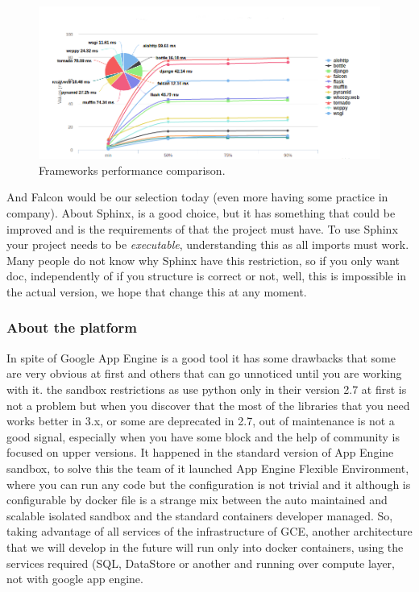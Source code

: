 \begin{figure}[H]
  \includegraphics[scale=0.5]{img/graphics/frameworks.png}
  \centering
  \caption{Frameworks performance comparison.}
\end{figure}


\noindent And Falcon would be our selection today (even more having some practice in
company).
\intro
About Sphinx, is a good choice, but it has something that could be improved and
is the requirements of that the project must have. To use Sphinx your project
needs to be \textit{executable}, understanding this as all imports must work.
Many people do not know why Sphinx have this restriction, so if you
only want doc, independently of if you structure is correct or not, well, this is
impossible in the actual version, we hope that change this at any moment.

\subsubsection{About the platform}

In spite of Google App Engine is a good tool it has some drawbacks that some are
very obvious at first and others that can go unnoticed until you are working with it.
the sandbox restrictions as use python only in their version 2.7 at first is not
a problem but when you discover that the most of the libraries that you need works
better in 3.x, or some are deprecated in 2.7, out of maintenance is not a good
signal, especially when you have some block and the help of community is focused
on upper versions. It happened in the standard version of App Engine sandbox, to
solve this the team of it launched App Engine Flexible Environment, where you can
run any code but the configuration is not trivial and it although is configurable by
docker file is a strange mix between the auto maintained and scalable isolated
sandbox and the standard containers developer managed.
\intro
So, taking advantage of all services of the infrastructure of GCE, another
architecture that we will develop in the future will run only into docker containers,
using the services required (SQL, DataStore or another and running over compute layer,
not with google app engine.

